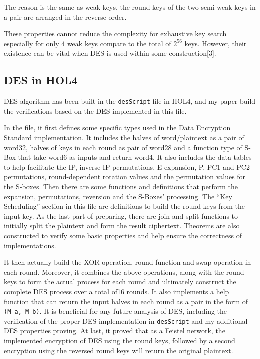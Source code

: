 \documentclass{article}
\begin{document}
The reason
is the same as weak keys, the round keys of the two semi-weak keys in a pair are arranged in the reverse order.

These properties cannot reduce the complexity for exhaustive key search especially for only 4 weak keys compare to the total
of $2^{56}$ keys. However, their existence can be vital when DES is used within some construction[3].

\subsection{DES in HOL4}
DES algorithm has been built in the \verb|desScript| file in HOL4, and my paper build the verifications based on the DES implemented
in this file.

In the file, it first defines some specific types used in
the Data Encryption Standard implementation. It includes the halves of word/plaintext as a pair of word32, halves of
keys in each round as pair of word28 and a function type of S-Box that take word6 as inputs and return
word4. It also includes the data tables to help facilitate the IP, inverse IP permutations, E expansion, P, PC1 and PC2
permutations, round-dependent rotation values and the permutation values for the S-boxes. Then there are
some functions and definitions that perform the expansion, permutations, reversion and the S-Boxes' processing. The ``Key Scheduling'' section
in this file are definitions to build the round keys from the input key. As the last part of preparing, there are
join and split functions to initially split the plaintext and form the result ciphertext. Theorems are also constructed to
verify some basic properties and help ensure the correctness of implementations.

It then actually build the XOR operation, round function and swap operation in each round. Moreover, it combines the above operations, along with the
round keys to form the actual process for each round and ultimately construct the complete DES process over a total of16 rounds.
It also implements a help function that can return the input halves in each round as a pair in the form of \verb|(M a, M b)|. It is beneficial
for any future analysis of DES, including the verification of the proper DES implementation in \verb|desScript| and my additional DES
properties proving. At last, it proved that as a Feistel network, the implemented encryption of DES using the round
keys, followed by a second encryption using the reversed round keys
will return the original plaintext.
\end{document}
